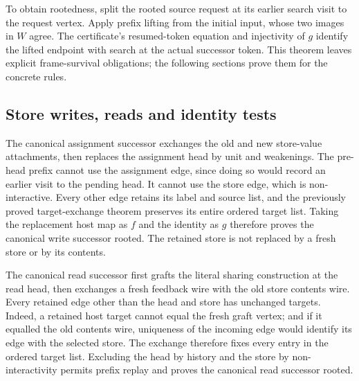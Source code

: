 
To obtain rootedness, split the rooted source request at its earlier search
visit to the request vertex. Apply prefix lifting from the initial input,
whose two images in $W$ agree. The certificate's resumed-token equation and
injectivity of $g$ identify the lifted endpoint with search at the actual
successor token. This theorem leaves explicit frame-survival obligations;
the following sections prove them for the concrete rules.


\subsection{Store writes, reads and identity tests}

The canonical assignment successor exchanges the old and new store-value
attachments, then replaces the assignment head by unit and weakenings.
The pre-head prefix cannot use the assignment edge, since doing so would
record an earlier visit to the pending head. It cannot use the store edge,
which is non-interactive. Every other edge retains its label and source list,
and the previously proved target-exchange theorem preserves its entire ordered
target list. Taking the replacement host map as $f$ and the identity as $g$
therefore proves the canonical write successor rooted. The retained store is
not replaced by a fresh store or by its contents.


The canonical read successor first grafts the literal sharing construction
at the read head, then exchanges a fresh feedback wire with the old store
contents wire. Every retained edge other than the head and store has unchanged
targets. Indeed, a retained host target cannot equal the fresh graft vertex;
and if it equalled the old contents wire, uniqueness of the incoming edge
would identify its edge with the selected store. The exchange therefore fixes
every entry in the ordered target list. Excluding the head by history and the
store by non-interactivity permits prefix replay and proves the canonical
read successor rooted.



